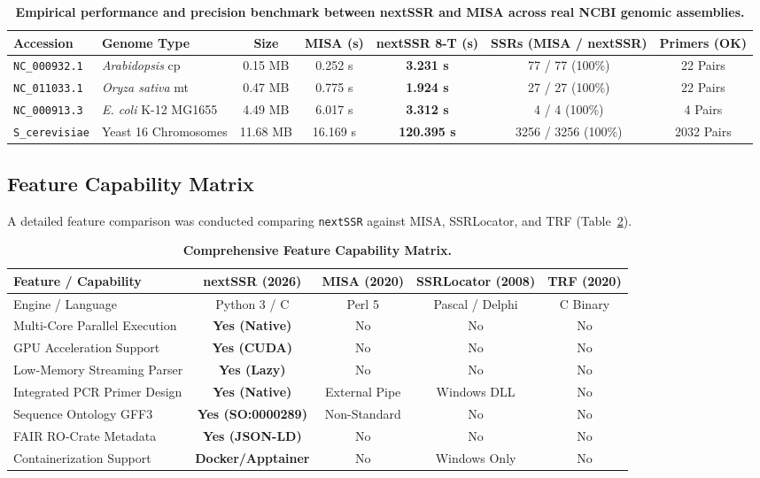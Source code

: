 \documentclass[fullpage]{article}
\begin{document}
\begin{table}[h!]
\centering
\caption{\textbf{Empirical performance and precision benchmark between nextSSR and MISA across real NCBI genomic assemblies.}}
\label{tab:benchmark}
\small
\begin{tabular}{llccccc}
\toprule
\textbf{Accession} & \textbf{Genome Type} & \textbf{Size} & \textbf{MISA (s)} & \textbf{nextSSR 8-T (s)} & \textbf{SSRs (MISA / nextSSR)} & \textbf{Primers (OK)} \\
\midrule
\texttt{NC_000932.1} & \textit{Arabidopsis} cp & 0.15 MB & 0.252 s & \textbf{3.231 s} & 77 / 77 (100\%) & 22 Pairs \\
\texttt{NC_011033.1} & \textit{Oryza sativa} mt & 0.47 MB & 0.775 s & \textbf{1.924 s} & 27 / 27 (100\%) & 22 Pairs \\
\texttt{NC_000913.3} & \textit{E. coli} K-12 MG1655 & 4.49 MB & 6.017 s & \textbf{3.312 s} & 4 / 4 (100\%) & 4 Pairs \\
\texttt{S_cerevisiae} & Yeast 16 Chromosomes & 11.68 MB & 16.169 s & \textbf{120.395 s} & 3256 / 3256 (100\%) & 2032 Pairs \\
\bottomrule
\end{tabular}
\end{table}

\subsection*{Feature Capability Matrix}
A detailed feature comparison was conducted comparing \texttt{nextSSR} against MISA, SSRLocator, and TRF (Table~\ref{tab:features}).

\begin{table}[h!]
\centering
\caption{\textbf{Comprehensive Feature Capability Matrix.}}
\label{tab:features}
\small
\begin{tabular}{lcccc}
\toprule
\textbf{Feature / Capability} & \textbf{nextSSR (2026)} & \textbf{MISA (2020)} & \textbf{SSRLocator (2008)} & \textbf{TRF (2020)} \\
\midrule
Engine / Language & Python 3 / C & Perl 5 & Pascal / Delphi & C Binary \\
Multi-Core Parallel Execution & \textbf{Yes (Native)} & No & No & No \\
GPU Acceleration Support & \textbf{Yes (CUDA)} & No & No & No \\
Low-Memory Streaming Parser & \textbf{Yes (Lazy)} & No & No & No \\
Integrated PCR Primer Design & \textbf{Yes (Native)} & External Pipe & Windows DLL & No \\
Sequence Ontology GFF3 & \textbf{Yes (SO:0000289)} & Non-Standard & No & No \\
FAIR RO-Crate Metadata & \textbf{Yes (JSON-LD)} & No & No & No \\
Containerization Support & \textbf{Docker/Apptainer} & No & Windows Only & No \\
\bottomrule
\end{tabular}
\end{table}
\end{document}
